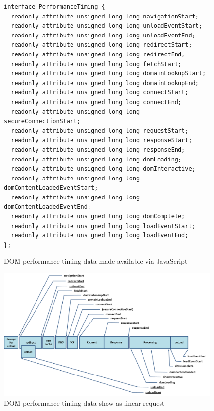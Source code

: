 \documentclass[12pt]{report}
\begin{document}
\begin{figure}[H]
\begin{lstlisting}
interface PerformanceTiming {
  readonly attribute unsigned long long navigationStart;
  readonly attribute unsigned long long unloadEventStart;
  readonly attribute unsigned long long unloadEventEnd;
  readonly attribute unsigned long long redirectStart;
  readonly attribute unsigned long long redirectEnd;
  readonly attribute unsigned long long fetchStart;
  readonly attribute unsigned long long domainLookupStart;
  readonly attribute unsigned long long domainLookupEnd;
  readonly attribute unsigned long long connectStart;
  readonly attribute unsigned long long connectEnd;
  readonly attribute unsigned long long secureConnectionStart;
  readonly attribute unsigned long long requestStart;
  readonly attribute unsigned long long responseStart;
  readonly attribute unsigned long long responseEnd;
  readonly attribute unsigned long long domLoading;
  readonly attribute unsigned long long domInteractive;
  readonly attribute unsigned long long domContentLoadedEventStart;
  readonly attribute unsigned long long domContentLoadedEventEnd;
  readonly attribute unsigned long long domComplete;
  readonly attribute unsigned long long loadEventStart;
  readonly attribute unsigned long long loadEventEnd;
};
\end{lstlisting}
\caption{DOM performance timing data made available via JavaScript \cite{w3cNavigationTiming}}
\label{fig:performanceTimingData}
\end{figure}


\begin{figure}[H]
\centering
\includegraphics[width=150mm]{figures/images/timing_overview.png}
\caption{DOM performance timing data show as linear request \cite{w3cNavigationTiming}}
\label{fig:performanceTimingChart}
\end{figure}
\end{document}
